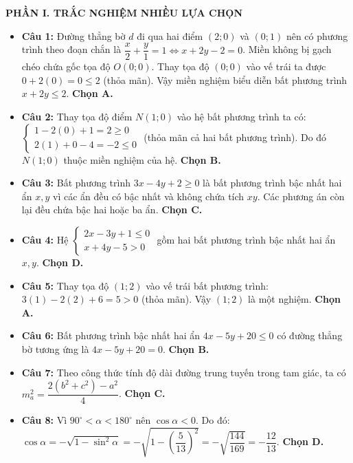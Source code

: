\documentclass[12pt,a4paper]{article}
\begin{document}
\textbf{PHẦN I. TRẮC NGHIỆM NHIỀU LỰA CHỌN}
\begin{itemize}[leftmargin=0.6cm]
    \item \textbf{Câu 1:} Đường thẳng bờ $d$ đi qua hai điểm $(2; 0)$ và $(0; 1)$ nên có phương trình theo đoạn chắn là $\dfrac{x}{2} + \dfrac{y}{1} = 1 \iff x + 2y - 2 = 0$. Miền không bị gạch chéo chứa gốc tọa độ $O(0; 0)$. Thay tọa độ $(0; 0)$ vào vế trái ta được $0 + 2(0) = 0 \le 2$ (thỏa mãn). Vậy miền nghiệm biểu diễn bất phương trình $x + 2y \le 2$. \textbf{Chọn A.}

    \item \textbf{Câu 2:} Thay tọa độ điểm $N(1; 0)$ vào hệ bất phương trình ta có:
    $\begin{cases} 1 - 2(0) + 1 = 2 \ge 0 \\ 2(1) + 0 - 4 = -2 \le 0 \end{cases}$ (thỏa mãn cả hai bất phương trình). Do đó $N(1; 0)$ thuộc miền nghiệm của hệ. \textbf{Chọn B.}

    \item \textbf{Câu 3:} Bất phương trình $3x - 4y + 2 \ge 0$ là bất phương trình bậc nhất hai ẩn $x, y$ vì các ẩn đều có bậc nhất và không chứa tích $xy$. Các phương án còn lại đều chứa bậc hai hoặc ba ẩn. \textbf{Chọn C.}

    \item \textbf{Câu 4:} Hệ $\begin{cases} 2x - 3y + 1 \le 0 \\ x + 4y - 5 > 0 \end{cases}$ gồm hai bất phương trình bậc nhất hai ẩn $x, y$. \textbf{Chọn D.}

    \item \textbf{Câu 5:} Thay tọa độ $(1; 2)$ vào vế trái bất phương trình: $3(1) - 2(2) + 6 = 5 > 0$ (thỏa mãn). Vậy $(1; 2)$ là một nghiệm. \textbf{Chọn A.}

    \item \textbf{Câu 6:} Bất phương trình bậc nhất hai ẩn $4x - 5y + 20 \le 0$ có đường thẳng bờ tương ứng là $4x - 5y + 20 = 0$. \textbf{Chọn B.}

    \item \textbf{Câu 7:} Theo công thức tính độ dài đường trung tuyến trong tam giác, ta có $m_a^2 = \dfrac{2(b^2 + c^2) - a^2}{4}$. \textbf{Chọn C.}

    \item \textbf{Câu 8:} Vì $90^\circ < \alpha < 180^\circ$ nên $\cos \alpha < 0$. Do đó:
    $\cos \alpha = -\sqrt{1 - \sin^2 \alpha} = -\sqrt{1 - \left(\dfrac{5}{13}\right)^2} = -\sqrt{\dfrac{144}{169}} = -\dfrac{12}{13}$. \textbf{Chọn D.}


\end{itemize}
\end{document}
